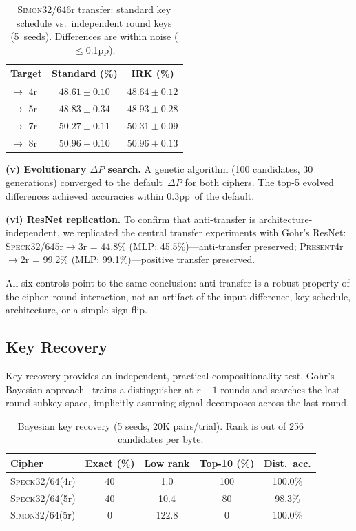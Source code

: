 \documentclass[runningheads]{llncs}
\newcommand{\speck}{\textsc{Speck32/64}}
\newcommand{\simon}{\textsc{Simon32/64}}
\newcommand{\present}{\textsc{Present}}
\newcommand{\pp}{pp}
\begin{document}
\begin{table}[htbp]
\centering
\caption{\simon 6r transfer: standard key schedule vs.\ independent round keys (5~seeds). Differences are within noise ($\leq$0.1\pp).}\label{tab:irk}
\begin{tabular}{@{}lcc@{}}
\toprule
\textbf{Target} & \textbf{Standard (\%)} & \textbf{IRK (\%)} \\
\midrule
$\to$ 4r & $48.61 \pm 0.10$ & $48.64 \pm 0.12$ \\
$\to$ 5r & $48.83 \pm 0.34$ & $48.93 \pm 0.28$ \\
$\to$ 7r & $50.27 \pm 0.11$ & $50.31 \pm 0.09$ \\
$\to$ 8r & $50.96 \pm 0.10$ & $50.96 \pm 0.13$ \\
\bottomrule
\end{tabular}
\end{table}

\textbf{(v) Evolutionary $\Delta P$ search.}
A genetic algorithm (100 candidates, 30 generations) converged to the default~$\Delta P$ for both ciphers.
The top-5 evolved differences achieved accuracies within 0.3\pp\ of the default.

\textbf{(vi) ResNet replication.}
To confirm that anti-transfer is architecture-independent, we replicated the central transfer experiments with Gohr's ResNet:
\speck 5r$\to$3r = 44.8\% (MLP: 45.5\%)---anti-transfer preserved;
\present 4r$\to$2r = 99.2\% (MLP: 99.1\%)---positive transfer preserved.

All six controls point to the same conclusion: anti-transfer is a robust property of the cipher--round interaction, not an artifact of the input difference, key schedule, architecture, or a simple sign flip.


\subsection{Key Recovery}
\label{sec:exp-key}

Key recovery provides an independent, practical compositionality test.
Gohr's Bayesian approach~\cite{gohr2019} trains a distinguisher at $r{-}1$ rounds and searches the last-round subkey space, implicitly assuming signal decomposes across the last round.

\begin{table}[htbp]
\centering
\caption{Bayesian key recovery (5 seeds, 20K pairs/trial).
         Rank is out of 256 candidates per byte.}\label{tab:key}
\begin{tabular}{@{}lcccc@{}}
\toprule
\textbf{Cipher} & \textbf{Exact (\%)} & \textbf{Low rank} & \textbf{Top-10 (\%)} & \textbf{Dist.\ acc.} \\
\midrule
\speck (4r) & 40 & 1.0  & 100 & 100.0\% \\
\speck (5r) & 40 & 10.4 & 80  & 98.3\%  \\
\simon (5r) & 0  & 122.8 & 0  & 100.0\% \\
\bottomrule
\end{tabular}
\end{table}
\end{document}
